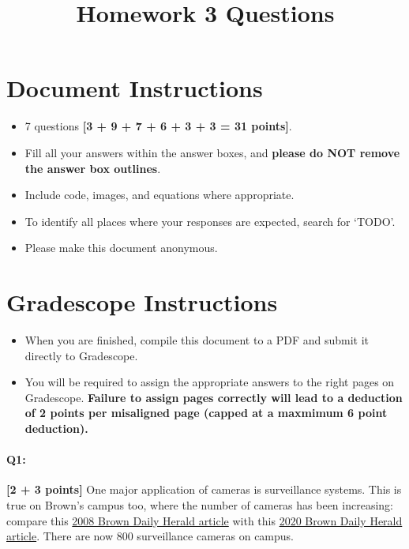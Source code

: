 \date{}

\title{\vspace{-1cm}Homework 3 Questions}



\maketitle
\vspace{-2cm}
\thispagestyle{fancy}

\section*{ Document Instructions}
\begin{itemize}
  \item 7 questions \textbf{[3 + 9 + 7 + 6 + 3 + 3 = 31 points]}.
  \item Fill all your answers within the answer boxes, and \textbf{please do NOT remove the answer box outlines}.
  \item Include code, images, and equations where appropriate.
  \item To identify all places where your responses are expected, search for `TODO'.
  \item Please make this document anonymous.
\end{itemize}

\section*{ Gradescope Instructions}
\begin{itemize}
  \item When you are finished, compile this document to a PDF and submit it directly to Gradescope. 
  \item You will be required to assign the appropriate answers to the right pages on Gradescope. \textbf{Failure to assign pages correctly will lead to a deduction of 2 points per misaligned page (capped at a maxmimum 6 point deduction).}
\end{itemize}
\pagebreak



\paragraph{Q1:} \textbf{[2 + 3 points]} One major application of cameras is surveillance systems. This is true on Brown's campus too, where the number of cameras has been increasing: compare this \href{https://www.browndailyherald.com/2008/01/10/surveillance-cameras-on-campus-triple/}{2008 Brown Daily Herald article} with this \href{https://www.browndailyherald.com/2020/02/21/cameras-installed-hegeman-hall/}{2020 Brown Daily Herald article}. There are now 800 surveillance cameras on campus.

